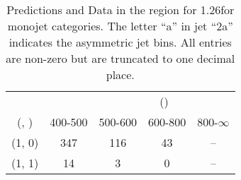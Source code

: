 \begin{table}[h!]
\tiny
\centering
\caption{Predictions and Data in the \gj region for 1.26\ifb for monojet categories. The letter ``a'' in jet \eg ``2a''  indicates the asymmetric jet bins. All entries are non-zero but are truncated to one decimal place.\label{tab:yieldsseppost_gj_data_mono}}
\begin{tabular}
{ccccc}
	\hline\hline
&	& \multicolumn{4}{c}{\scalht (\gev)} \\ 
	 (\njet,  \nb) & 400-500 & 500-600 & 600-800 & 800-$\infty$ \\ [0.8ex] 
\hline
	(1, 0) & 347 & 116 & 43 & -- \\[0.5ex] 
	(1, 1) & 14 & 3 & 0 & -- \\[0.5ex] 
	\hline
	\hline
\end{tabular}
\end{table}
